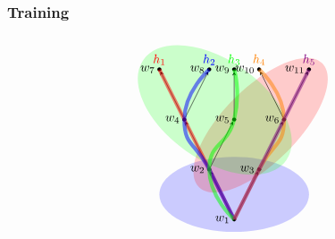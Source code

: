 \documentclass[xcolor=x11names]{beamer}
\begin{document}
\begin{frame}
	\frametitle{Training}
\footnotesize
\[\begin{tikzpicture}[world/.style={inner sep=.4mm, fill=black, circle},>=stealth, scale=.7]

\begin{scope}[opacity=.2]
\fill[blue]  (0,-1) ellipse (3 and 1.5);
\fill[red,rotate=45]  (2,0.5) ellipse (3.5 and 1.5);
\fill[green, rotate=-35]  (-2,1.5) ellipse (3.5 and 2);
\end{scope}
\node[world] (v1) at (0,-2) {};
\node[world] (v2) at (-1,0) {};
\node[world] (v3) at (1,0) {};
\node[world] (v4) at (-2,2) {};
\node[world] (v5) at (0,2) {};
\node[world] (v6) at (-3,4) {};
\node[world] (v9) at (2,2) {};
\node[world] (v10) at (1,4) {};
\node[world] (v11) at (3,4) {};
\node[world] (v8) at (0,4) {};
\node[world] (v7) at (-1,4) {};
\draw[->]  (v1) edge (v2);
\draw[->]  (v1) edge (v3);
\draw[->]  (v2) edge (v4);
\draw[->]  (v2) edge (v5);
\draw[->]  (v4) edge (v6);
\draw[->]  (v4) edge (v7);
\draw[->]  (v5) edge (v8);
\draw[->]  (v3) edge (v9);
\draw[->]  (v9) edge (v10);
\draw[->]  (v9) edge (v11);



\begin{scope}[line width=3, opacity=.5]
\draw[red]    plot[smooth, tension=1] coordinates {(v1) (v2) (v4) (v6)};
\draw[blue]   plot[smooth, tension=1] coordinates {(v1) (v2) (v4) (v7)};
\draw[green]  plot[smooth, tension=1] coordinates {(v1) (v2) (v5) (v8)};
\draw[orange] plot[smooth, tension=1] coordinates {(v1) (v3) (v9) (v10)};
\draw[violet] plot[smooth, tension=1] coordinates {(v1) (v3) (v9) (v11)};
\end{scope}
\begin{scope}[anchor=south]
\node[red] at (v6) {$h_1$};
\node[blue] at (v7) {$h_2$};
\node[green] at (v8) {$h_3$};
\node[orange] at (v10) {$h_4$};
\node[violet] at (v11) {$h_5$};
\end{scope}

\node[anchor=east] at (v4){$w_4$};
\node[anchor=east] at (v5){$w_5$};
\node[anchor=east] at (v9){$w_6$};
\node[anchor=east] at (v2){$w_2$};
\node[anchor=east] at (v3){$w_3$};
\node[anchor=east] at (v1){$w_1$};
\node[anchor=east] at (v6){$w_7$};
\node[anchor=east] at (v7){$w_8$};
\node[anchor=east] at (v8){$w_9$};
\node[anchor=east] at (v10){$w_{10}$};
\node[anchor=east] at (v11){$w_{11}$};


\end{tikzpicture}\]
\end{frame}
\end{document}
